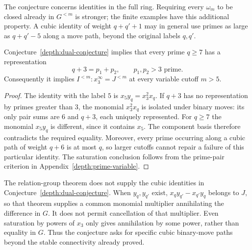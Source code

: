 The conjecture concerns identities in the full ring. Requiring every
$\omega_m$ to be closed already in $G^{<m}$ is stronger; the finite
examples have this additional property. A cubic identity of weight
$q+q'+1$ may in general use primes as large as $q+q'-5$ along a move
path, beyond the original labels $q,q'$.

\begin{proposition}\label{depth:dual-prime-pair}
Conjecture~\ref{depth:dual-conjecture} implies that every prime
$q\ge7$ has a representation
\[
 q+3=p_1+p_2,\qquad p_1,p_2>3\text{ prime}.
\]
Consequently it implies $I^{<m}:x_3^\infty=J^{<m}$ at every
variable cutoff $m>5$.
\end{proposition}
\begin{proof}
The identity with the label $5$ is $x_5y_q=x_3^2x_q$.
If $q+3$ has no representation by primes greater than $3$, the
monomial $x_3^2x_q$ is isolated under binary moves: its only pair
sums are $6$ and $q+3$, each uniquely represented. For $q\ge7$ the
monomial $x_5y_q$ is different, since it contains $x_5$.
The component basis therefore contradicts the required equality.
Moreover, every prime occurring along a cubic path of weight $q+6$
is at most $q$, so larger cutoffs cannot repair a failure of this
particular identity. The saturation conclusion follows from the
prime-pair criterion in Appendix~\ref{depth:prime-variable}.
\end{proof}

The relation-group theorem does not supply the cubic identities in
Conjecture~\ref{depth:dual-conjecture}. When $y_q,y_{q'}$ exist,
$x_qy_{q'}-x_{q'}y_q$ belongs to $J$, so that theorem supplies a common
monomial multiplier annihilating the difference in $G$.
It does not permit cancellation of that multiplier. Even saturation
by powers of $x_3$ only gives annihilation by some power, rather
than equality in $G$. Thus the conjecture asks for specific cubic
binary-move paths beyond the stable connectivity already proved.

